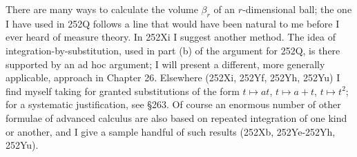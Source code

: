 {There are many ways to calculate the volume $\beta_r$ of an
$r$-dimensional ball;  the one I have used in 252Q follows a line that
would have been natural to me before I ever heard of measure theory.
In 252Xi I suggest another method.   The idea of
integration-by-substitution, used in part (b) of the argument for 252Q,
is there
supported by an ad hoc argument;  I will present a different, more
generally applicable, approach in Chapter 26.   Elsewhere (252Xi, 252Yf,
252Yh, 252Yu) I find myself taking for granted substitutions of the form
$t\mapsto at$, $t\mapsto a+t$, $t\mapsto t^2$;
for a systematic justification, see
\S263.   Of course an enormous number of other formulae of advanced
calculus are also based on repeated integration of one kind or another,
and I give a sample handful of such results (252Xb,
252Ye-252Yh, %
252Yu).

}%

\discrpage


